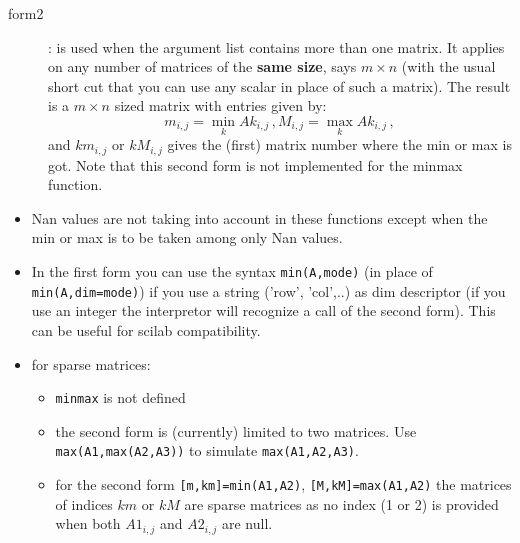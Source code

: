 \begin{mandescription}
\begin{description}
\item[form2]: is used when the argument list contains more than one matrix. It applies on any number of matrices of 
             the {\bf same size}, says $m \times n$ (with the usual short cut that you can use any scalar in place of such a matrix). 
  The result is a $m \times n$ sized matrix with entries given by:
    $$
        m_{i,j} = \min_k Ak_{i,j}\,,  M_{i,j} = \max_k Ak_{i,j}\,,
  $$    
  and $km_{i,j}$ or $kM_{i,j}$ gives the (first) matrix number where the min or max is got.
  Note that this second form is not implemented for the minmax function.
\end{description}
\begin{itemize} 
\item Nan values are not taking into account in these functions except when the min or max is to 
  be taken among only Nan values. 
\item In the first form you can use the syntax \verb+min(A,mode)+ (in place of \verb+min(A,dim=mode)+)
  if you use a string ('row', 'col',..) as dim descriptor (if you use an integer the interpretor will 
  recognize a call of the second form). This can be useful for scilab compatibility.
\item for sparse matrices: 
  \begin{itemize}
  \item \verb+minmax+ is not defined
  \item the second form is (currently) limited to two matrices. Use \verb+max(A1,max(A2,A3))+ to
    simulate \verb+max(A1,A2,A3)+. 
  \item for the second form \verb+[m,km]=min(A1,A2)+, \verb+[M,kM]=max(A1,A2)+ the matrices 
    of indices $km$ or $kM$ are sparse matrices as  no index (1 or 2) is provided when 
    both $A1_{i,j}$ and  $A2_{i,j}$ are null.
  \end{itemize}
\end{itemize}
\end{mandescription}

